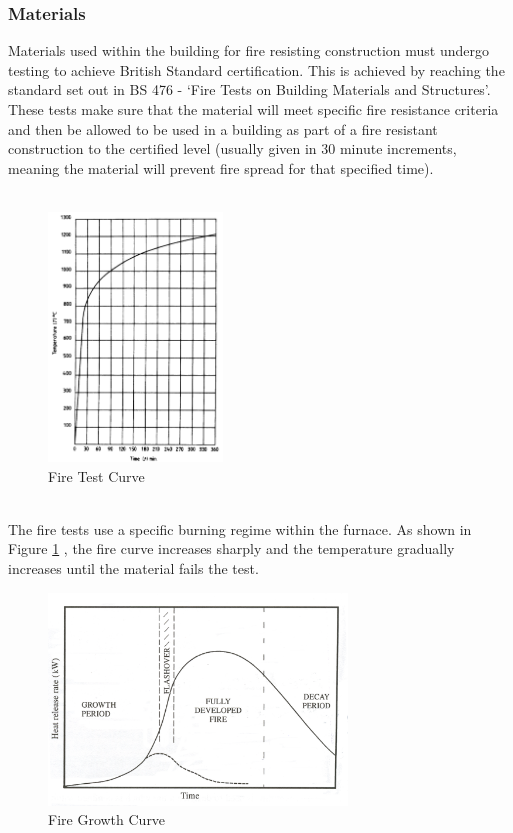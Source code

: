\documentclass[table,a4paper,oneside]{book}
\begin{document}
\subsubsection{Materials}
Materials used within the building for fire resisting construction must undergo testing to achieve British Standard certification. This is achieved by reaching the standard set out in BS 476 - `Fire Tests on Building Materials and Structures'. These tests make sure that the material will meet specific fire resistance criteria and then be allowed to be used in a building as part of a fire resistant construction to the certified level (usually given in 30 minute increments, meaning the material will prevent fire spread for that specified time).
\\
\\
\begin{figure}[h]
 \begin{center}
  \includegraphics[height=250px]{./Pics/Fire_Curve}
 \end{center}
  \caption{Fire Test Curve}
  \label{fig:Fire Test Curve}
\end{figure}
\\
The fire tests use a specific burning regime within the furnace. As shown in Figure \ref{fig:Fire Test Curve} \citep{BSI476}, the fire curve increases sharply and the temperature gradually increases until the material fails the test. 
\begin{figure}[h]
 \begin{center}
  \includegraphics[width=300px]{./Pics/Normal_Fire}
 \end{center}
  \caption{Fire Growth Curve}
  \label{fig:Fire Growth Curve}
\end{figure}
\end{document}
